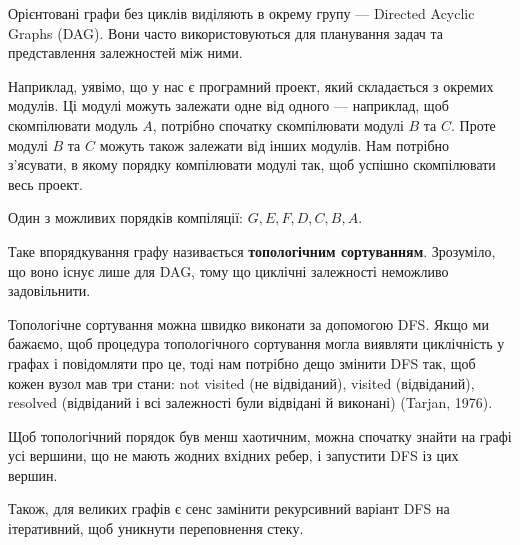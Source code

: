 \documentclass[12pt,a4paper]{report}
\begin{document}
Орієнтовані графи без циклів виділяють в окрему групу --- Directed Acyclic Graphs (DAG). Вони часто використовуються для планування задач та представлення залежностей між ними.

Наприклад, уявімо, що у нас є програмний проект, який складається з окремих модулів. Ці модулі можуть залежати одне від одного --- наприклад, щоб скомпілювати модуль \(A\), потрібно спочатку скомпілювати модулі \(B\) та \(C\). Проте модулі \(B\) та \(C\) можуть також залежати від інших модулів. Нам потрібно з’ясувати, в якому порядку компілювати модулі так, щоб успішно скомпілювати весь проект.

\begin{center}
\end{center}

Один з можливих порядків компіляції: \(G, E, F, D, C, B, A\).

Таке впорядкування графу називається \textbf{топологічним сортуванням}. Зрозуміло, що воно існує лише для DAG, тому що циклічні залежності неможливо задовільнити.

Топологічне сортування можна швидко виконати за допомогою DFS. Якщо ми бажаємо, щоб процедура топологічного сортування могла виявляти циклічність у графах і повідомляти про це, тоді нам потрібно дещо змінити DFS так, щоб кожен вузол мав три стани: not visited (не відвіданий), visited (відвіданий), resolved (відвіданий і всі залежності були відвідані й виконані) (Tarjan, 1976).

Щоб топологічний порядок був менш хаотичним, можна спочатку знайти на графі усі вершини, що не мають жодних вхідних ребер, і запустити DFS із цих вершин.

Також, для великих графів є сенс замінити рекурсивний варіант DFS на ітеративний, щоб уникнути переповнення стеку.


\end{document}
